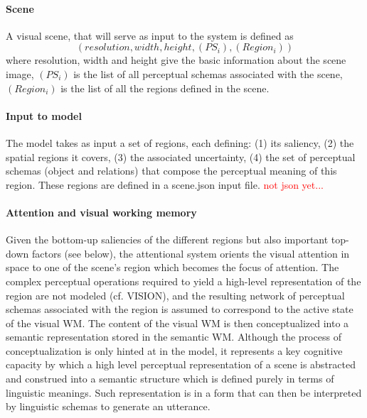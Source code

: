 \documentclass{article}
\newcommand\todo[1]{\textcolor{red}{#1}}
\begin{document}
\paragraph{Scene}
A visual scene, that will serve as input to the system is defined as
$$(resolution, width, height, (PS_i), (Region_i))$$ where
resolution, width and height give the basic information about the scene image, $(PS_i)$ is the list of all perceptual schemas associated with the scene, $(Region_i)$ is the list of all the regions defined in the scene. 

\paragraph{Input to model}
The model takes as input a set of regions, each defining: (1) its saliency, (2) the spatial regions it covers, (3) the associated uncertainty, (4) the set of perceptual schemas (object and relations) that compose the perceptual meaning of this region.
These regions are defined in a scene.json input file. \todo{not json yet...}

\paragraph{Attention and visual working memory}
Given the bottom-up saliencies of the different regions but also important top-down factors (see below), the attentional system orients the visual attention in space to one of the scene's region which becomes the focus of attention. The complex perceptual operations required to yield a high-level representation of the region are not modeled (cf. VISION), and the resulting network of perceptual schemas associated with the region is assumed to correspond to the active state of the visual WM. The content of the visual WM is then conceptualized into a semantic representation stored in the semantic WM. Although the process of conceptualization is only hinted at in the model, it represents a key cognitive capacity by which a high level perceptual representation of a scene is abstracted and construed into a semantic structure which is defined purely in terms of linguistic meanings. Such representation is in a form that can then be interpreted by linguistic schemas to generate an utterance.
\end{document}
